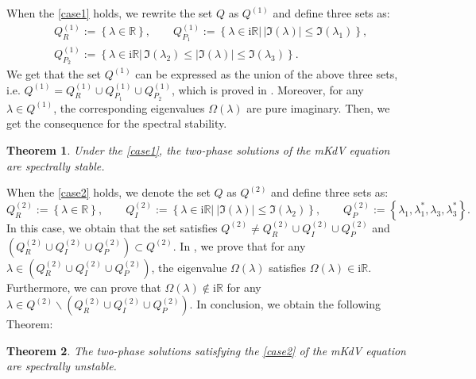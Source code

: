 \documentclass[11pt,reqno]{amsart}
\newcommand{\ii}{\mathrm{i}}
\newtheorem{theorem}{Theorem}
\numberwithin{equation}{section}
\begin{document}
When the \ref{case1} holds, we rewrite the set $Q$ as $Q^{(1)}$ and define three sets as: 
\begin{equation}\label{eq:define-hat-Q}
	\begin{split}
		& Q^{(1)} _R:=\left\{\lambda \in  \mathbb{R}\right\}, \qquad
		 Q^{(1)} _{P_1}:=
		\left\{\lambda \in \ii \mathbb{R}\left| \,
		|\Im(\lambda)|\le\Im(\lambda_1) \right.\right\}, \\
		&  Q^{(1)} _{P_2}:=
		\left\{\lambda \in \ii \mathbb{R} \left| \,
		\Im(\lambda_2) \le |\Im(\lambda)|\le\Im(\lambda_3) \right.\right\}.
	\end{split}
\end{equation}
We get that the set $Q^{(1)}$ can be expressed as the union of the above three sets, i.e. $Q^{(1)}= Q^{(1)} _R\cup  Q^{(1)} _{P_1} \cup  Q^{(1)} _{P_2}$, which is proved in .
Moreover, for any $\lambda\in Q^{(1)}$, the corresponding eigenvalues $\Omega(\lambda)$ are pure imaginary.
Then, we get the consequence for the spectral stability.
\begin{theorem}\label{theorem:spectral-image}
	Under the \ref{case1}, the two-phase solutions of the mKdV equation are spectrally stable.
\end{theorem}

When the \ref{case2} holds, we denote the set $Q$ as $Q^{(2)}$ and define three sets as: 
\begin{equation}\label{eq:define-Q-C-IRp}
	 Q^{(2)}_{R}:=\left\{\lambda\in \mathbb{R}\right\}, \qquad 
	 Q^{(2)}_{I}:=\left\{\lambda\in \ii \mathbb{R}\left| \ |\Im(\lambda)|\le \Im(\lambda_2)\right.\right\}, \qquad 
	 Q^{(2)}_{P}:=\left\{\lambda_1,\lambda_1^*,\lambda_3,\lambda_3^* \right\}.
\end{equation}
In this case, we obtain that the set satisfies $Q^{(2)}\neq Q^{(2)}_{R} \cup Q^{(2)}_{I} \cup Q^{(2)}_{P}$ and $(Q^{(2)}_{R} \cup Q^{(2)}_{I} \cup  Q^{(2)}_{P})\subset Q^{(2)}$. 
In , we prove that for any $\lambda \in (Q^{(2)}_{R} \cup Q^{(2)}_{I} \cup  Q^{(2)}_{P})$, the eigenvalue $\Omega(\lambda)$ satisfies $\Omega(\lambda)\in \ii \mathbb{R}$.
Furthermore, we can prove that $\Omega(\lambda)\notin \ii \mathbb{R}$ for any $\lambda \in Q^{(2)}\backslash(Q^{(2)}_{R} \cup Q^{(2)}_{I} \cup  Q^{(2)}_{P})$.
In conclusion, we obtain the following Theorem:
\begin{theorem}\label{theorem:spectral-complex}
	The two-phase solutions satisfying the \ref{case2} of the mKdV equation are spectrally unstable.
\end{theorem}
\end{document}
